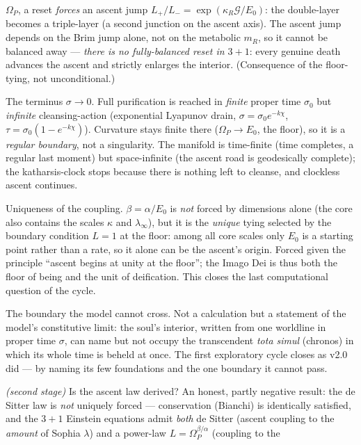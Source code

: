 \documentclass[11pt,a4paper]{article}
\theoremstyle{plain}
\theoremstyle{definition}
\theoremstyle{remark}
\begin{document}
\begin{description}[leftmargin=4.2em,style=nextline,itemsep=2pt]
$\Omega_P$, a reset \emph{forces} an ascent jump $L_+/L_-=\exp(\kappa_R\mathcal G/E_0)$: the
double-layer becomes a triple-layer (a second junction on the ascent axis). The ascent jump depends on
the Brim jump alone, not on the metabolic $m_R$, so it cannot be balanced away --- \emph{there is no
fully-balanced reset in $3{+}1$}: every genuine death advances the ascent and strictly enlarges the
interior. (Consequence of the floor-tying, not unconditional.)
\item[\textbf{v0.6}] The terminus $\sigma\to0$. Full purification is reached in
\emph{finite} proper time $\sigma_0$ but \emph{infinite} cleansing-action (exponential Lyapunov drain,
$\sigma=\sigma_0e^{-k\chi}$, $\tau=\sigma_0(1-e^{-k\chi})$). Curvature stays finite there ($\Omega_P\to
E_0$, the floor), so it is a \emph{regular boundary}, not a singularity. The manifold is time-finite
(time completes, a regular last moment) but space-infinite (the ascent road is geodesically complete);
the katharsis-clock stops because there is nothing left to cleanse, and clockless ascent continues.
\item[\textbf{v0.7}] Uniqueness of the coupling. $\beta=\alpha/E_0$ is \emph{not}
forced by dimensions alone (the core also contains the scales $\kappa$ and $\lambda_\infty$), but it is
the \emph{unique} tying selected by the boundary condition $L=1$ at the floor: among all core scales
only $E_0$ is a starting point rather than a rate, so it alone can be the ascent's origin. Forced given
the principle ``ascent begins at unity at the floor''; the Imago Dei is thus both the floor of being
and the unit of deification. This closes the last computational question of the cycle.
\item[\textbf{Epilogue}] The boundary the model cannot cross. Not a calculation
but a statement of the model's constitutive limit: the soul's interior, written from one worldline in
proper time $\sigma$, can name but not occupy the transcendent \emph{tota simul} (chronos) in which its
whole time is beheld at once. The first exploratory cycle closes as v2.0 did --- by naming its few
foundations and the one boundary it cannot pass.
\item[\textbf{v0.8}] \emph{(second stage)} Is the ascent law derived? An honest, partly
negative result: the de Sitter law is \emph{not} uniquely forced --- conservation (Bianchi) is
identically satisfied, and the $3{+}1$ Einstein equations admit \emph{both} de Sitter (ascent coupling
to the \emph{amount} of Sophia $\lambda$) and a power-law $L=\Omega_P^{\beta/\alpha}$ (coupling to the

\end{description}
\end{document}
